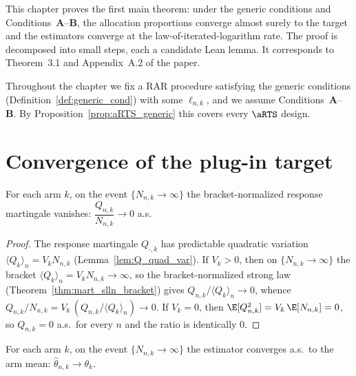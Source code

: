 This chapter proves the first main theorem: under the generic conditions and
Conditions~\textbf{A}--\textbf{B}, the allocation proportions converge almost
surely to the target and the estimators converge at the law-of-iterated-logarithm
rate. The proof is decomposed into small steps, each a candidate Lean lemma. It
corresponds to Theorem~3.1 and Appendix~A.2 of the paper.

Throughout the chapter we fix a RAR procedure satisfying the generic conditions
(Definition~\ref{def:generic_cond}) with some $\ell_{n,k}$, and we assume
Conditions~\textbf{A}--\textbf{B}. By Proposition~\ref{prop:aRTS_generic} this
covers every $\aRTS$ design.

\section{Convergence of the plug-in target}
\label{sec:cons_rho_limit}

\begin{lemma}\label{lem:respMart_div_count_slln}
\leanok
{}
For each arm $k$, on the event $\{N_{n,k}\to\infty\}$ the bracket-normalized response
martingale vanishes: $\dfrac{Q_{n,k}}{N_{n,k}}\to 0$ a.s.
\end{lemma}

\begin{proof}\leanok
{}
The response martingale $Q_{\cdot,k}$ has predictable quadratic variation
$\langle Q_k\rangle_n = V_k N_{n,k}$ (Lemma~\ref{lem:Q_quad_var}). If $V_k>0$, then on
$\{N_{n,k}\to\infty\}$ the bracket $\langle Q_k\rangle_n = V_k N_{n,k}\to\infty$, so the
bracket-normalized strong law (Theorem~\ref{thm:mart_slln_bracket}) gives
$Q_{n,k}/\langle Q_k\rangle_n\to0$, whence
$Q_{n,k}/N_{n,k} = V_k\,(Q_{n,k}/\langle Q_k\rangle_n)\to0$. If $V_k=0$, then
$\E[Q_{n,k}^2] = V_k\,\E[N_{n,k}] = 0$, so $Q_{n,k}=0$ a.s.\ for every $n$ and the ratio is
identically $0$.
\end{proof}

\begin{lemma}\label{lem:theta_limit_infinite}
\leanok
{}
For each arm $k$, on the event $\{N_{n,k}\to\infty\}$ the estimator converges a.s.\ to the arm
mean: $\hat\theta_{n,k}\to\theta_k$.
\end{lemma}

